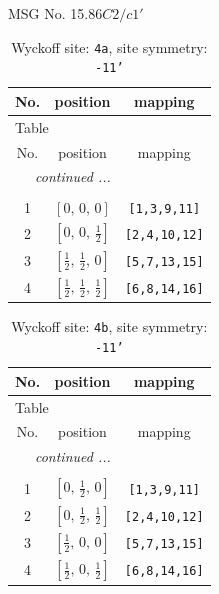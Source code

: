 \documentclass[fleqn,8pt]{jsarticle}
\begin{document}
\setcounter{MaxMatrixCols}{32}

\renewcommand{\tablename}{Table~}
\renewcommand{\figurename}{Figure~}
\begin{center}
\LARGE
MSG No. 15.86\quad$C2/c1'$
\end{center}
\renewcommand{\arraystretch}{1.2}
\begin{longtable}{ccc}
\caption{Wyckoff site: {\tt 4a}, site symmetry: {\tt -11'}}
 \\
 \hline \hline
No. & position & mapping \\ \hline \endfirsthead

\multicolumn{2}{l}{\tablename\ \thetable{}} \\
 \hline \hline
No. & position & mapping \\ \hline \endhead

 \hline \hline
\multicolumn{2}{r}{\footnotesize\it continued ...} \\ \endfoot

 \hline \hline
\multicolumn{2}{r}{} \\ \endlastfoot

1 & $\left[ 0,\, 0,\, 0 \right]$ & {\tt [1,3,9,11]} \\ \hline
2 & $\left[ 0,\, 0,\, \frac{1}{2} \right]$ & {\tt [2,4,10,12]} \\ \hline
3 & $\left[ \frac{1}{2},\, \frac{1}{2},\, 0 \right]$ & {\tt [5,7,13,15]} \\ \hline
4 & $\left[ \frac{1}{2},\, \frac{1}{2},\, \frac{1}{2} \right]$ & {\tt [6,8,14,16]} \\
\end{longtable}
\renewcommand{\arraystretch}{1.2}
\begin{longtable}{ccc}
\caption{Wyckoff site: {\tt 4b}, site symmetry: {\tt -11'}}
 \\
 \hline \hline
No. & position & mapping \\ \hline \endfirsthead

\multicolumn{2}{l}{\tablename\ \thetable{}} \\
 \hline \hline
No. & position & mapping \\ \hline \endhead

 \hline \hline
\multicolumn{2}{r}{\footnotesize\it continued ...} \\ \endfoot

 \hline \hline
\multicolumn{2}{r}{} \\ \endlastfoot

1 & $\left[ 0,\, \frac{1}{2},\, 0 \right]$ & {\tt [1,3,9,11]} \\ \hline
2 & $\left[ 0,\, \frac{1}{2},\, \frac{1}{2} \right]$ & {\tt [2,4,10,12]} \\ \hline
3 & $\left[ \frac{1}{2},\, 0,\, 0 \right]$ & {\tt [5,7,13,15]} \\ \hline
4 & $\left[ \frac{1}{2},\, 0,\, \frac{1}{2} \right]$ & {\tt [6,8,14,16]} \\
\end{longtable}
\end{document}
